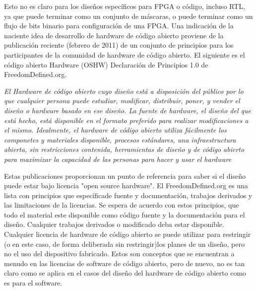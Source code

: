 Esto no es claro para los diseños específicos para FPGA o código, incluso RTL, ya que puede terminar como un conjunto de máscaras, o puede terminar como un flujo de bits binario para configuración de una FPGA.
Una indicación de la naciente idea de desarrollo de hardware de código abierto proviene de la publicación reciente (febrero de 2011) de un conjunto de principios para los participantes de la comunidad de hardware de código abierto. El siguiente es el código abierto Hardware (OSHW) Declaración de Principios 1.0 de FreedomDefined.org.

\textit{El Hardware de código abierto cuyo diseño está a disposición del público
por lo que cualquier persona puede estudiar, modificar, distribuir, poner, y vender el
diseño o hardware basado en ese diseño. La fuente de hardware, el diseño
del que está hecho, está disponible en el formato preferido para realizar
modificaciones a el mismo. Idealmente, el hardware de código abierto utiliza fácilmente los componetes y materiales disponible, procesos estándares, una infraestructura abierta, sin restricciones
contenida, herramientas de diseño y de código abierto para maximizar la capacidad
de las personas para hacer y usar el hardware} \cite{Etiqueta11}

Estas publicaciones proporcionan un punto de referencia para saber si el diseño puede estar bajo licencia "open source hardware".
El FreedomDefined.org es una lista con principios que específicade  fuente y  documentación, trabajos derivados y las limitaciones de la licencias. Se espera de acuerdo con estos principios, que todo el material este disponible como código fuente y la documentación para el diseño. Cualquier trabajos derivados o modificado deba estar disponible. 
Cualquier licencia de hardware de código abierto se puede utilizar para restringir (o en este caso, de forma deliberada sin restringir)los planes de un diseño, pero no el uso del dispositivo fabricado. Estos son conceptos que se encuentran a menudo en las licencias de software de código abierto, pero de nuevo, no es tan claro como se aplica en el casos del diseño del hardware de código abierto como es para el software. 

